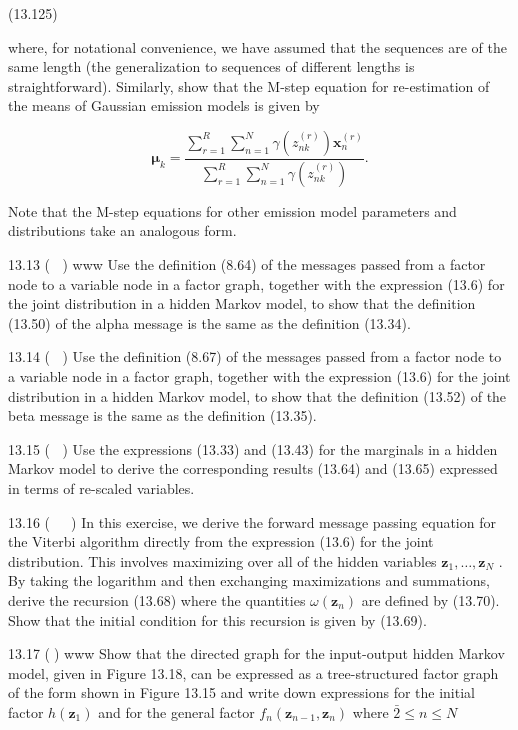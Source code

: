 \documentclass[
  10
]{article}
\begin{document}
(13.125)

where, for notational convenience, we have assumed that the sequences
are of the same length (the generalization to sequences of different
lengths is straightforward). Similarly, show that the M-step equation
for re-estimation of the means of Gaussian emission models is given by

\[
\boldsymbol {\mu} _ {k} = \frac {\sum_ {r = 1} ^ {R} \sum_ {n = 1} ^ {N} \gamma (z _ {n k} ^ {(r)}) \mathbf {x} _ {n} ^ {(r)}}{\sum_ {r = 1} ^ {R} \sum_ {n = 1} ^ {N} \gamma (z _ {n k} ^ {(r)})}.\tag{13.126}
\]

Note that the M-step equations for other emission model parameters and
distributions take an analogous form.

13.13 ( ) www Use the definition (8.64) of the messages passed from a
factor node to a variable node in a factor graph, together with the
expression (13.6) for the joint distribution in a hidden Markov model,
to show that the definition (13.50) of the alpha message is the same as
the definition (13.34).

13.14 ( ) Use the definition (8.67) of the messages passed from a factor
node to a variable node in a factor graph, together with the expression
(13.6) for the joint distribution in a hidden Markov model, to show that
the definition (13.52) of the beta message is the same as the definition
(13.35).

13.15 ( ) Use the expressions (13.33) and (13.43) for the marginals in a
hidden Markov model to derive the corresponding results (13.64) and
(13.65) expressed in terms of re-scaled variables.

13.16 (  ) In this exercise, we derive the forward message passing
equation for the Viterbi algorithm directly from the expression (13.6)
for the joint distribution. This involves maximizing over all of the
hidden variables
\(\mathbf { z } _ { 1 } , \ldots , \mathbf { z } _ { N }\) . By taking
the logarithm and then exchanging maximizations and summations, derive
the recursion (13.68) where the quantities
\(\omega ( \mathbf { z } _ { n } )\) are defined by (13.70). Show that
the initial condition for this recursion is given by (13.69).

13.17 () www Show that the directed graph for the input-output hidden
Markov model, given in Figure 13.18, can be expressed as a
tree-structured factor graph of the form shown in Figure 13.15 and write
down expressions for the initial factor \(h ( \mathbf { z } _ { 1 } )\)
and for the general factor
\(f _ { n } ( \mathbf { z } _ { n - 1 } , \mathbf { z } _ { n } )\)
where \({ \bar { 2 } } \leqslant n \leqslant N\)
\end{document}
